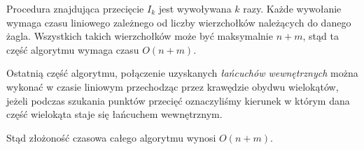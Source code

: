 Procedura znajdująca przecięcie $I_k$ jest wywoływana $k$ razy. Każde
wywołanie wymaga czasu liniowego zależnego od liczby wierzchołków
należących do danego żagla. Wszystkich takich wierzchołków może być
maksymalnie $n + m$, stąd ta część algorytmu wymaga czasu $O(n + m)$.

Ostatnią część algorytmu, połączenie uzyskanych \emph{łańcuchów
  wewnętrznych} można wykonać w czasie liniowym przechodząc przez
krawędzie obydwu wielokątów, jeżeli podczas szukania punktów przecięć
oznaczyliśmy kierunek w którym dana część wielokąta staje się
łańcuchem wewnętrznym.

Stąd złożoność czasowa całego algorytmu wynosi $O(n + m)$.

